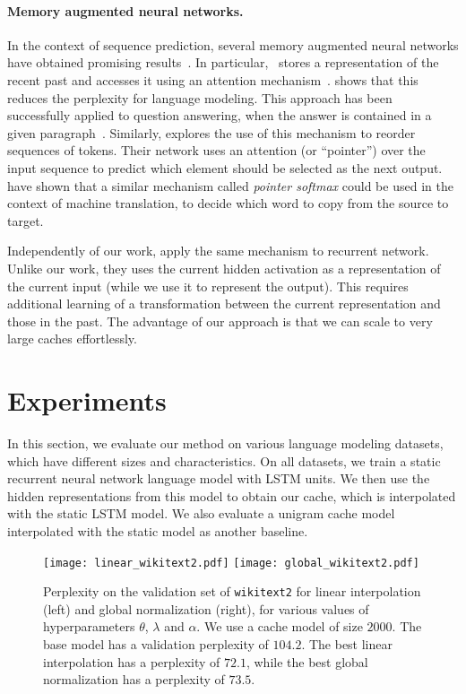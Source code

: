 \documentclass{article} \usepackage{iclr2017_conference,times}
\begin{document}
\paragraph{Memory augmented neural networks.} 
In the context of sequence prediction, 
several memory augmented neural networks have obtained promising
results~\citep{sukhbaatar2015end,graves2014neural,grefenstette2015learning,joulin2015inferring}.
In particular,~\citet{sukhbaatar2015end} stores a representation of the 
recent past and accesses it using an attention mechanism~\cite{bahdanau2014neural}.
\citet{sukhbaatar2015end} shows that this reduces the perplexity for language
modeling.  This approach has been successfully applied to question
answering, when the answer is contained in a given
paragraph~\citep{chen2016thorough,hermann2015teaching,kadlec2016text,sukhbaatar2015end}.
Similarly, \citet{vinyals2015pointer} explores the use of this mechanism to
reorder sequences of tokens. Their network uses an attention (or ``pointer'')
over the input sequence to predict which element should be selected as the next
output.  \citet{gulcehre2016pointing} have shown that a similar mechanism
called \emph{pointer softmax} could be used in the context of machine
translation,  to decide which word to copy from the source to target.  

Independently of our work, \citet{merity2016pointer} apply the same mechanism
to recurrent network. Unlike our work, they uses the current hidden activation
as a representation of the current input (while we use it to represent the
    output). This requires additional learning of a transformation between the current
representation and those in the past. The advantage of our
approach is that we can scale to very large caches effortlessly. 
 
\section{Experiments}

In this section, we evaluate our method on various language modeling datasets, which have different sizes and characteristics.
On all datasets, we train a static recurrent neural network language model with LSTM units.
We then use the hidden representations from this model to obtain our cache, which is interpolated with the static LSTM model.
We also evaluate a unigram cache model interpolated with the static model as another baseline.

\begin{figure}
  \centering
  \texttt{[image: linear\_wikitext2.pdf]}
  \texttt{[image: global\_wikitext2.pdf]}

  \vspace{-0.5cm}
  \caption{Perplexity on the validation set of \texttt{wikitext2} for linear interpolation (left) and global normalization (right), for various values of hyperparameters $\theta$, $\lambda$ and $\alpha$.
    We use a cache model of size $2000$. The base model has a validation perplexity of $104.2$.
    The best linear interpolation has a perplexity of $72.1$, while the best global normalization has a perplexity of $73.5$.}
  \label{fig:wikitext2}
\end{figure}
\end{document}
